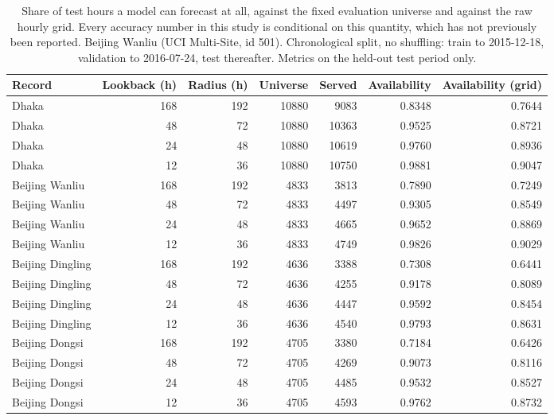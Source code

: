 \begin{table}[htbp]
\caption{Share of test hours a model can forecast at all, against the fixed evaluation universe and against the raw hourly grid. Every accuracy number in this study is conditional on this quantity, which has not previously been reported. Beijing Wanliu (UCI Multi-Site, id 501). Chronological split, no shuffling: train to 2015-12-18, validation to 2016-07-24, test thereafter. Metrics on the held-out test period only.}
\label{tab:forecast_availability}
\begin{tabular}{lrrrrrr}
\toprule
Record & Lookback (h) & Radius (h) & Universe & Served & Availability & Availability (grid) \\
\midrule
Dhaka & 168 & 192 & 10880 & 9083 & 0.8348 & 0.7644 \\
Dhaka & 48 & 72 & 10880 & 10363 & 0.9525 & 0.8721 \\
Dhaka & 24 & 48 & 10880 & 10619 & 0.9760 & 0.8936 \\
Dhaka & 12 & 36 & 10880 & 10750 & 0.9881 & 0.9047 \\
Beijing Wanliu & 168 & 192 & 4833 & 3813 & 0.7890 & 0.7249 \\
Beijing Wanliu & 48 & 72 & 4833 & 4497 & 0.9305 & 0.8549 \\
Beijing Wanliu & 24 & 48 & 4833 & 4665 & 0.9652 & 0.8869 \\
Beijing Wanliu & 12 & 36 & 4833 & 4749 & 0.9826 & 0.9029 \\
Beijing Dingling & 168 & 192 & 4636 & 3388 & 0.7308 & 0.6441 \\
Beijing Dingling & 48 & 72 & 4636 & 4255 & 0.9178 & 0.8089 \\
Beijing Dingling & 24 & 48 & 4636 & 4447 & 0.9592 & 0.8454 \\
Beijing Dingling & 12 & 36 & 4636 & 4540 & 0.9793 & 0.8631 \\
Beijing Dongsi & 168 & 192 & 4705 & 3380 & 0.7184 & 0.6426 \\
Beijing Dongsi & 48 & 72 & 4705 & 4269 & 0.9073 & 0.8116 \\
Beijing Dongsi & 24 & 48 & 4705 & 4485 & 0.9532 & 0.8527 \\
Beijing Dongsi & 12 & 36 & 4705 & 4593 & 0.9762 & 0.8732 \\
\bottomrule
\end{tabular}
\end{table}
